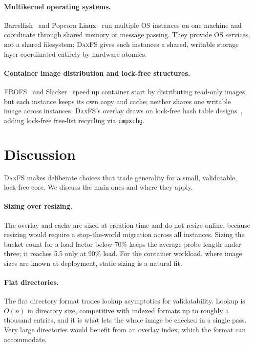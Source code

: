 \documentclass[letterpaper,twocolumn,10pt]{article}
\newcommand{\daxfs}{\textsc{DaxFS}\xspace}
\begin{document}
\paragraph{Multikernel operating systems.}
Barrelfish~\cite{baumann09:multikernel} and Popcorn
Linux~\cite{barbalace15:popcorn} run multiple OS instances on one
machine and coordinate through shared memory or message passing.  They
provide OS services, not a shared filesystem; \daxfs gives such
instances a shared, writable storage layer coordinated entirely by
hardware atomics.

\paragraph{Container image distribution and lock-free structures.}
EROFS~\cite{gao20:erofs} and Slacker~\cite{harter16:slacker} speed up
container start by distributing read-only images, but each instance
keeps its own copy and cache; neither shares one writable image across
instances.  \daxfs's overlay draws on lock-free hash table
designs~\cite{michael02:lockfree,herlihy08:art}, adding lock-free
free-list recycling via \texttt{cmpxchg}.

\section{Discussion}
\label{sec:discussion}

\daxfs makes deliberate choices that trade generality for a small,
validatable, lock-free core.  We discuss the main ones and where they
apply.

\paragraph{Sizing over resizing.}
The overlay and cache are sized at creation time and do not resize
online, because resizing would require a stop-the-world migration
across all instances.  Sizing the bucket count for a load factor below
70\% keeps the average probe length under three; it reaches 5.5 only at
90\% load.  For the container workload, where image sizes are known at
deployment, static sizing is a natural fit.

\paragraph{Flat directories.}
The flat directory format trades lookup asymptotics for validatability.
Lookup is $O(n)$ in directory size, competitive with indexed formats up
to roughly a thousand entries, and it is what lets the whole image be
checked in a single pass.  Very large directories would benefit from an
overlay index, which the format can accommodate.
\end{document}
